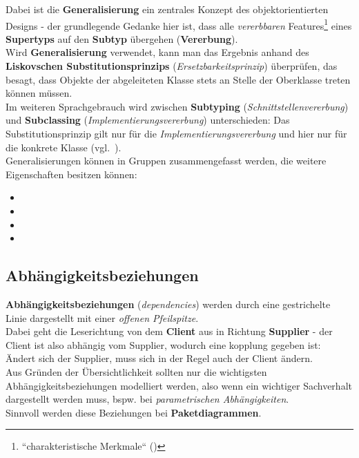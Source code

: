 \noindent
Dabei ist die \textbf{Generalisierung} ein zentrales Konzept des objektorientierten Designs - der grundlegende Gedanke hier ist, dass alle \textit{vererbbaren} Features\footnote{
``charakteristische Merkmale`` (\cite[17]{Buh09})
} eines \textbf{Supertyps} auf den \textbf{Subtyp} übergehen (\textbf{Vererbung}).\\

\noindent
Wird \textbf{Generalisierung} verwendet, kann man das Ergebnis anhand des \textbf{Liskovschen Substitutionsprinzips} (\textit{Ersetzbarkeitsprinzip}) überprüfen, das besagt, dass Objekte der abgeleiteten Klasse stets an Stelle der Oberklasse treten können müssen.\\

\noindent
Im weiteren Sprachgebrauch wird zwischen \textbf{Subtyping} (\textit{Schnittstellenvererbung}) und \textbf{Subclassing} (\textit{Implementierungsvererbung}) unterschieden:
Das Substitutionsprinzip gilt nur für die \textit{Implementierungsvererbung} und hier nur für die konkrete Klasse (vgl.~\cite[26]{Buh09}).\\

\noindent
Generalisierungen können in Gruppen zusammengefasst werden, die weitere Eigenschaften besitzen können:

\begin{itemize}
    \item {}
    \item {}
    \item {}
    \item {}
\end{itemize}

\subsection*{Abhängigkeitsbeziehungen}
\textbf{Abhängigkeitsbeziehungen} (\textit{dependencies}) werden durch eine gestrichelte Linie dargestellt mit einer \textit{offenen Pfeilspitze}.\\
Dabei geht die Leserichtung von dem \textbf{Client} aus in Richtung \textbf{Supplier} - der Client ist also abhängig vom Supplier, wodurch eine kopplung gegeben ist: Ändert sich der Supplier, muss sich in der Regel auch der Client ändern.\\

\noindent
Aus Gründen der Übersichtlichkeit sollten nur die wichtigsten Abhängigkeitsbeziehungen modelliert werden, also wenn ein wichtiger Sachverhalt dargestellt werden muss, bspw. bei \textit{parametrischen Abhängigkeiten}.\\
Sinnvoll werden diese Beziehungen bei \textbf{Paketdiagrammen}.